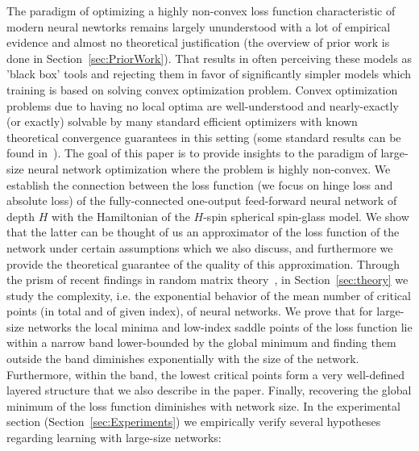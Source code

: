 \documentclass[twoside]{article}
\begin{document}
The paradigm of optimizing a highly non-convex loss function characteristic of modern neural newtorks remains largely ununderstood with a lot of empirical evidence and almost no theoretical justification (the overview of prior work is done in Section~\ref{sec:PriorWork}). That results in often perceiving these models as 'black box' tools and rejecting them in favor of significantly simpler models which training is based on solving convex optimization problem. Convex optimization problems due to having no local optima are well-understood and nearly-exactly (or exactly) solvable by many standard efficient optimizers with known theoretical convergence guarantees in this setting (some standard results can be found in~\cite{opac-b1104789, ben-tal_nemirovski:2001}). The goal of this paper is to provide insights to the paradigm of large-size neural network optimization where the problem is highly non-convex. We establish the connection between the loss function (we focus on hinge loss and absolute loss) of the fully-connected one-output feed-forward neural network of depth $H$ with the Hamiltonian of the $H$-spin spherical spin-glass model. We show that the latter can be thought of us an approximator of the loss function of the network under certain assumptions which we also discuss, and furthermore we provide the theoretical guarantee of the quality of this approximation. Through the prism of recent findings in random matrix theory~\cite{AAC2010}, in Section~\ref{sec:theory} we study the complexity, i.e. the exponential behavior of the mean number of critical points (in total and of given index), of neural networks. We prove that for large-size networks the local minima and low-index saddle points of the loss function lie within a narrow band lower-bounded by the global minimum and finding them outside the band diminishes exponentially with the size of the network. Furthermore, within the band, the lowest critical points form a very well-defined layered structure that we also describe in the paper. Finally, recovering the global minimum of the loss function diminishes with network size. In the experimental section (Section~\ref{sec:Experiments}) we empirically verify several hypotheses regarding learning with large-size networks:
\vspace{-0.05in}
\end{document}
